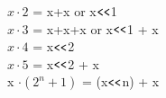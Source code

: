 \begin{center}
    $x\cdot2$ = x+x or  x$\verb|<<|$1 \\
    $x\cdot3$ = x+x+x or  x$\verb|<<|$1 + x \\
    $x\cdot4$ = x$\verb|<<|$2 \\
    $x\cdot5$ = x$\verb|<<|$2 + x \\
    x  $\cdot(2^n + 1)$ = (x$\verb|<<|$n) + x
\end{center}